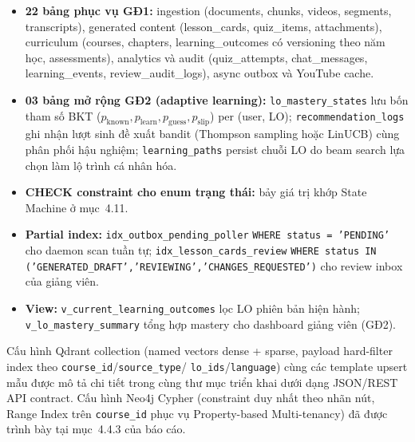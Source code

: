 \begin{itemize}
    \item \textbf{22 bảng phục vụ GĐ1:} ingestion (documents, chunks,
          videos, segments, transcripts), generated content
          (lesson\_cards, quiz\_items, attachments), curriculum
          (courses, chapters, learning\_outcomes có versioning theo
          năm học, assessments), analytics và audit (quiz\_attempts,
          chat\_messages, learning\_events, review\_audit\_logs), async
          outbox và YouTube cache.
    \item \textbf{03 bảng mở rộng GĐ2 (adaptive learning):}
          \texttt{lo\_mastery\_states} lưu bốn tham số BKT
          ($p_{\text{known}}, p_{\text{learn}}, p_{\text{guess}},
          p_{\text{slip}}$) per (user, LO);
          \texttt{recommendation\_logs} ghi nhận lượt sinh đề xuất bandit
          (Thompson sampling hoặc LinUCB) cùng phân phối hậu nghiệm;
          \texttt{learning\_paths} persist chuỗi LO do beam search lựa
          chọn làm lộ trình cá nhân hóa.
    \item \textbf{CHECK constraint cho enum trạng thái:} bảy giá trị
          khớp State Machine ở mục~4.11.
    \item \textbf{Partial index:} \texttt{idx\_outbox\_pending\_poller}
          \texttt{WHERE status = 'PENDING'} cho daemon scan tuần tự;
          \texttt{idx\_lesson\_cards\_review} \texttt{WHERE status IN
          ('GENERATED\_DRAFT','REVIEWING','CHANGES\_REQUESTED')} cho
          review inbox của giảng viên.
    \item \textbf{View:} \texttt{v\_current\_learning\_outcomes} lọc LO
          phiên bản hiện hành; \texttt{v\_lo\_mastery\_summary} tổng hợp
          mastery cho dashboard giảng viên (GĐ2).
\end{itemize}

Cấu hình Qdrant collection (named vectors dense + sparse, payload
hard-filter index theo \texttt{course\_id}/\texttt{source\_type}/
\texttt{lo\_ids}/\texttt{language}) cùng các template upsert mẫu được
mô tả chi tiết trong cùng thư mục triển khai dưới dạng JSON/REST API
contract. Cấu hình Neo4j Cypher (constraint duy nhất theo nhãn nút,
Range Index trên \texttt{course\_id} phục vụ Property-based
Multi-tenancy) đã được trình bày tại mục~4.4.3 của báo cáo.
